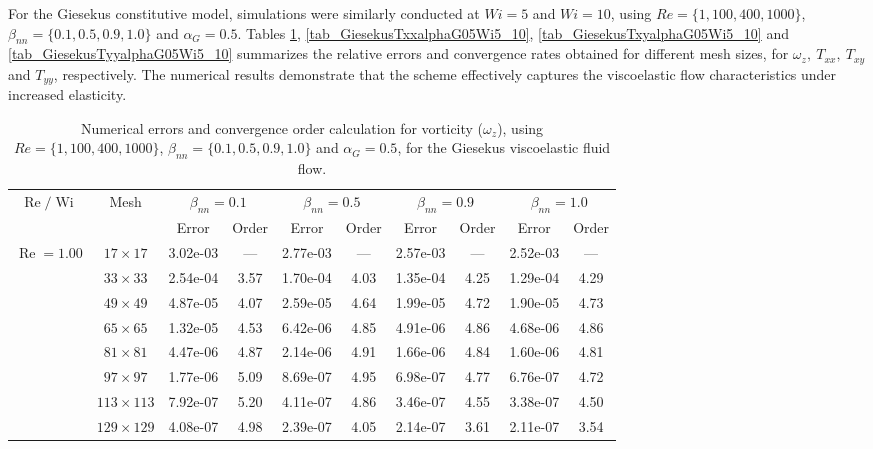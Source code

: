\documentclass[preprint, 12pt]{elsarticle}
\begin{document}
{For the Giesekus constitutive model, simulations were similarly conducted at $Wi = 5$ and $Wi = 10$, using $Re=\{1,100,400,1000\}$, $\beta_{nn}=\{0.1,0.5,0.9,1.0\}$ and $\alpha_G = 0.5$. Tables \ref{tab_GiesekusWzalphaG05Wi5_10}, \ref{tab_GiesekusTxxalphaG05Wi5_10}, \ref{tab_GiesekusTxyalphaG05Wi5_10} and \ref{tab_GiesekusTyyalphaG05Wi5_10} summarizes the relative errors and convergence rates obtained for different mesh sizes, for $\omega_z,\ T_{xx},\ T_{xy}$ and $T_{yy}$, respectively. The numerical results demonstrate that the scheme effectively captures the viscoelastic flow characteristics under increased elasticity.

\begin{center}
\begin{table}[H]
\caption{Numerical errors and convergence order calculation for vorticity ($\omega_{z}$), using $Re=\{1,100,400,1000\}$, $\beta_{nn}=\{0.1,0.5,0.9,1.0\}$ and $\alpha_G = 0.5$, for the Giesekus viscoelastic fluid flow.\label{tab_GiesekusWzalphaG05Wi5_10}}
\tiny{
    \begin{tabular*}{\textwidth}{@{\extracolsep\fill}cccccccccc@{}}
    \hline
    \multirow{2}{*}{$\operatorname{Re}/\operatorname{Wi}$} & \multirow{2}{*}{Mesh} & \multicolumn{2}{c}{$\beta_{nn}=0.1$}  & \multicolumn{2}{c}{$\beta_{nn}=0.5$}  & \multicolumn{2}{c}{$\beta_{nn}=0.9$}  & \multicolumn{2}{c}{$\beta_{nn}=1.0$}\\ %
     & & Error & Order & Error & Order & Error & Order & Error & Order \\
    \hline
    \multirow{7}{*}{$\operatorname{Re}=1.00$} & $17\times 17$ & 3.02e-03 & --- & 2.77e-03 & --- & 2.57e-03 & --- & 2.52e-03 & --- \\
& $33\times 33$ & 2.54e-04 & 3.57 & 1.70e-04 & 4.03 & 1.35e-04 & 4.25 & 1.29e-04 & 4.29 \\
& $49\times 49$ & 4.87e-05 & 4.07 & 2.59e-05 & 4.64 & 1.99e-05 & 4.72 & 1.90e-05 & 4.73 \\
\multirow{3}{*}{$\operatorname{Wi}=5$} & $65\times 65$ & 1.32e-05 & 4.53 & 6.42e-06 & 4.85 & 4.91e-06 & 4.86 & 4.68e-06 & 4.86 \\
& $81\times 81$ & 4.47e-06 & 4.87 & 2.14e-06 & 4.91 & 1.66e-06 & 4.84 & 1.60e-06 & 4.81 \\
& $97\times 97$ & 1.77e-06 & 5.09 & 8.69e-07 & 4.95 & 6.98e-07 & 4.77 & 6.76e-07 & 4.72 \\
& $113\times 113$ & 7.92e-07 & 5.20 & 4.11e-07 & 4.86 & 3.46e-07 & 4.55 & 3.38e-07 & 4.50 \\
& $129\times 129$ & 4.08e-07 & 4.98 & 2.39e-07 & 4.05 & 2.14e-07 & 3.61 & 2.11e-07 & 3.54 \\

\end{tabular*}}
\end{table}
\end{center}}
\end{document}
